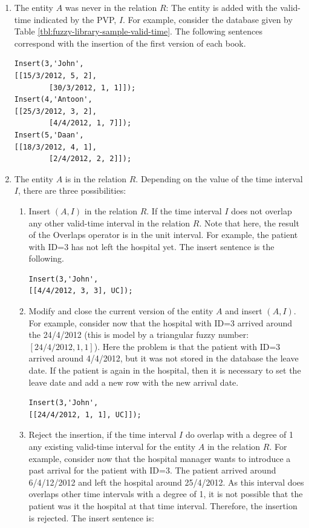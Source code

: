 \begin{enumerate}
\item The entity $A$ was never in the relation $R$: The entity is added with the valid-time indicated by the PVP, $I$.
For example, consider the database given by Table \ref{tbl:fuzzy-library-sample-valid-time}. The following sentences correspond with the insertion of the first version of each book.

\begin{verbatim}
Insert(3,'John',
[[15/3/2012, 5, 2],
        [30/3/2012, 1, 1]]);
Insert(4,'Antoon',
[[25/3/2012, 3, 2], 
        [4/4/2012, 1, 7]]);
Insert(5,'Daan',
[[18/3/2012, 4, 1], 
        [2/4/2012, 2, 2]]);
\end{verbatim}





\item The entity $A$ is in the relation $R$. Depending on the value of the time interval $I$, there are three possibilities:
	\begin{enumerate}
	\item Insert $\left(A, I\right)$ in the relation $R$. If the time interval $I$ does not overlap any other valid-time interval in the relation $R$. Note that here, the result of the Overlaps operator is in the unit interval.
For example, the patient with ID=3 has not left the hospital yet. The insert sentence is the following.

 \begin{verbatim}
Insert(3,'John',
[[4/4/2012, 3, 3], UC]);
	      \end{verbatim}

	\item Modify and close the current version of the entity $A$ and insert $\left(A, I \right)$. For example, consider now that the hospital with ID=3 arrived  around the 24/4/2012 (this is model by a triangular fuzzy number: $\left[24/4/2012, 1, 1 \right]$). Here the problem is that the patient with ID=3 arrived around 4/4/2012, but it was not stored in the database the leave date. If the patient is again in the hospital, then it is necessary to set the leave date and add a new row with the new arrival date. %
	    \begin{verbatim}
Insert(3,'John',
[[24/4/2012, 1, 1], UC]]);
	      \end{verbatim}

	\item Reject the insertion, if the time interval $I$ do overlap with a degree of 1 any existing valid-time interval for the entity $A$ in the relation $R$. For example, consider now that the hospital manager wants to introduce a past arrival for the patient with ID=3. The patient arrived around 6/4/12/2012 and left the hospital around 25/4/2012. As this interval does overlaps other time intervals with a degree of 1, it is not possible that the patient was it the hospital at that time interval. Therefore, the insertion is rejected. The insert sentence is:


\end{enumerate}
\end{enumerate}
